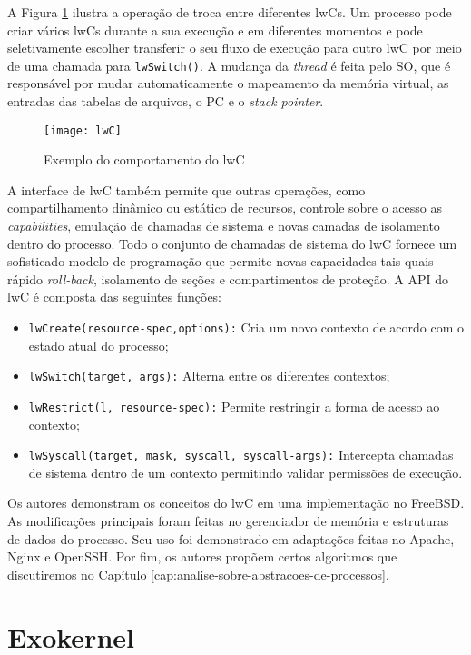 A Figura \ref{fig:lwc} ilustra a operação de troca entre diferentes lwCs. Um
processo pode criar vários lwCs durante a sua execução e em
diferentes momentos e pode
seletivamente escolher transferir o seu fluxo de execução para outro lwC por
meio de uma chamada para \texttt{lwSwitch()}. A mudança da \emph{thread} é
feita pelo SO, que é responsável por mudar automaticamente o mapeamento da
memória virtual, as entradas das tabelas de arquivos, o PC e o \emph{stack
pointer}.

\begin{figure}[!h]
  \centering
  \texttt{[image: lwC]} 
  \caption{Exemplo do comportamento do lwC}
  \label{fig:lwc} 
\end{figure}

A interface de lwC também permite que outras operações, como compartilhamento
dinâmico ou estático de recursos, controle sobre o acesso as
\emph{capabilities}, emulação de chamadas de sistema e novas camadas de
isolamento dentro do processo. Todo o conjunto de chamadas de sistema do lwC
fornece um sofisticado modelo de programação que permite novas capacidades
tais quais rápido \emph{roll-back}, isolamento de seções e compartimentos de
proteção. A API do lwC é composta das seguintes funções:

\begin{itemize}
  \item \texttt{lwCreate(resource-spec,options):} Cria um novo contexto de acordo com o estado atual do processo;
  \item \texttt{lwSwitch(target, args):} Alterna entre os diferentes contextos;
  \item \texttt{lwRestrict(l, resource-spec):} Permite restringir a forma de acesso ao contexto;
  \item \texttt{lwSyscall(target, mask, syscall, syscall-args):} Intercepta chamadas de sistema dentro de um contexto permitindo validar permissões de execução.
\end{itemize}

Os autores demonstram os conceitos do lwC em uma implementação no FreeBSD. As
modificações principais foram feitas no gerenciador de memória e estruturas de dados do
processo. Seu uso foi demonstrado em adaptações feitas no Apache, Nginx e
OpenSSH. Por fim, os autores propõem certos algoritmos que discutiremos no
Capítulo \ref{cap:analise-sobre-abstracoes-de-processos}.

\section{Exokernel}
\label{sec:exokernel}

